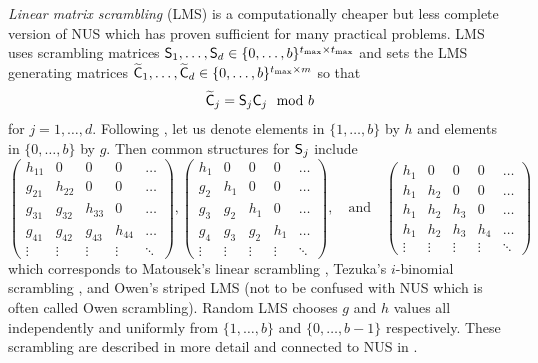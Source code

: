\documentclass[acmsmall]{acmart}
\begin{document}
\emph{Linear matrix scrambling} (LMS) is a computationally cheaper but less complete version of NUS which has proven sufficient for many practical problems. LMS uses scrambling matrices ${\mathsf{S}}_1,\dots,{\mathsf{S}}_d \in \{0,\dots,b\}^{t_\mathrm{max} \times t_\mathrm{max}}$ and sets the LMS generating matrices ${\widetilde{\mathsf{C}}}_1,\dots,{\widetilde{\mathsf{C}}}_d \in \{0,\dots,b\}^{t_\mathrm{max} \times m}$ so that 
$${\widetilde{\mathsf{C}}}_j = {\mathsf{S}}_j {\mathsf{C}}_j \mod b$$
for $j=1,\dots,d$. Following \citep{owen.variance_alternative_scrambles_digital_net}, let us denote elements in $\{1,\dots,b\}$ by $h$ and elements in $\{0,\dots,b\}$  by $g$. Then common structures for ${\mathsf{S}}_j$ include 
$$\begin{pmatrix} h_{11} & 0 & 0 & 0 & \dots \\ g_{21} & h_{22} & 0 & 0 & \dots \\ g_{31} & g_{32} & h_{33} & 0 & \dots \\ g_{41} & g_{42} & g_{43} & h_{44} & \dots \\ \vdots & \vdots & \vdots & \vdots & \ddots \end{pmatrix}, \begin{pmatrix} h_1 & 0 & 0 & 0 & \dots \\ g_2 & h_1 & 0 & 0 & \dots \\ g_3 & g_2 & h_1 & 0 & \dots \\ g_4 & g_3 & g_2 & h_1 & \dots \\ \vdots & \vdots & \vdots & \vdots & \ddots \end{pmatrix}, \quad\text{and}\quad \begin{pmatrix} h_1 & 0 & 0 & 0 & \dots \\ h_1 & h_2 & 0 & 0 & \dots \\ h_1 & h_2 & h_3 & 0 & \dots \\ h_1 & h_2 & h_3 & h_4 & \dots \\ \vdots & \vdots & \vdots & \vdots & \ddots \end{pmatrix}$$
which corresponds to Matousek’s linear scrambling \citep{MATOUSEK1998527}, Tezuka's $i$-binomial scrambling \citep{tezuka2002randomization}, and Owen's striped LMS \citep{owen.variance_alternative_scrambles_digital_net} (not to be confused with NUS which is often called Owen scrambling). Random LMS chooses $g$ and $h$ values all independently and uniformly from $\{1,\dots,b\}$ and $\{0,\dots,b-1\}$ respectively. These scrambling are described in more detail and connected to NUS in \citep{owen.variance_alternative_scrambles_digital_net}.
\end{document}

